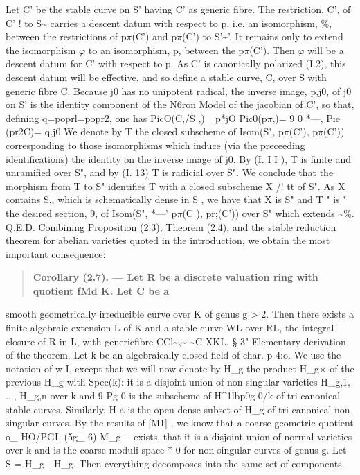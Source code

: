 \documentclass[11pt]{article}
\theoremstyle{plain}
\theoremstyle{definition}
\theoremstyle{remark}
\begin{document}
Let C' be the stable curve on S' having C' as generic fibre. The restriction, C', of C' ! to S\textasciitilde{} carries a descent datum with respect to p, i.e. an isomorphism, \%, between the restrictions of p$\pi$(C') and p$\pi$(C') to S'\textasciitilde{}'. It remains only to extend the isomorphism $\varphi$ to an isomorphism, p, between the p$\pi$(C'). Then $\varphi$ will be a descent datum for C' with respect to p. As C' is canonically polarized (I.2), this descent datum will be effective, and so define a stable curve, C, over S with generic fibre C. Because j0 has no unipotent radical, the inverse image, p,j0, of j0 on S' is the identity component of the N6ron Model of the jacobian of C', so that, defining q=poprl=popr2, one has PicO(C,/S ,) \_p*jO Pic0(p$\pi$,)= 9 0 *---, Pie (pr2C)= q.j0 We denote by T the closed subscheme of Isom(S", p$\pi$(C'), p$\pi$(C')) corresponding to those isomorphisms which induce (via the preceeding identifications) the identity on the inverse image of j0. By (I. I I ), T is finite and unramified over S", and by (I. 13) T is radicial over S". We conclude that the morphism from T to S" identifies T with a closed subscheme X /! tt of S". As X contains S,, which is schematically dense in S , we have that X is S" and T " is " the desired section, 9, of Isom(S", *---' p$\pi$(C ), pr;(C')) over S" which extends \textasciitilde{}\%. Q.E.D. Combining Proposition (2.3), Theorem (2.4), and the stable reduction theorem for abelian varieties quoted in the introduction, we obtain the most important consequence:

\begin{quote}\textbf{Corollary (2.7). --- Let R be a discrete valuation ring with quotient fMd K. Let C be a}\end{quote}
smooth geometrically irreducible curve over K of genus g > 2. Then there exists a finite algebraic extension L of K and a stable curve WL over RL, the integral closure of R in L, with genericfibre CCl\textasciitilde{},\textasciitilde{} \textasciitilde{}C XKL. § 3" Elementary derivation of the theorem. Let k be an algebraically closed field of char. p 4:o. We use the notation of w I, except that we will now denote by H\_g the product H\_g$\times$ of the previous H\_g with Spec(k): it is a disjoint union of non-singular varieties H\_g,1, ..., H\_g,n over k and 9 Pg 0 is the subscheme of H\textasciicircum{}1lbp0g-0/k of tri-canonical stable curves. Similarly, H a is the open dense subset of H\_g of tri-canonical non-singular curves. By the results of [M1] , we know that a coarse geometric quotient o\_ HO/PGL (5g\_ 6) M\_g--- exists, that it is a disjoint union of normal varieties over k and is the coarse moduli space * 0 for non-singular curves of genus g. Let S = H\_g---H\_g. Then everything decomposes into the same set of components.
\end{document}
